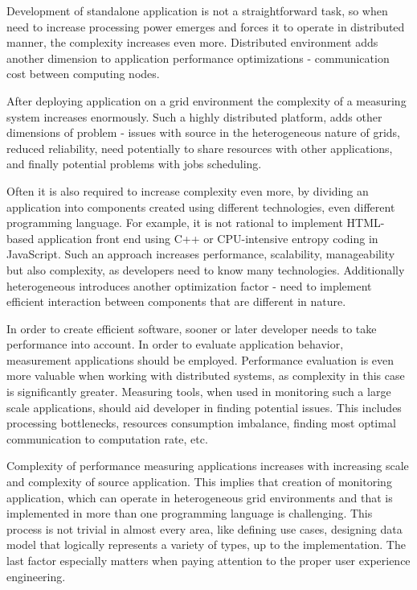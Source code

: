 Development of standalone application is not a straightforward task, so when need to increase processing power emerges and forces it to operate in distributed manner, the complexity increases even more. Distributed environment adds another dimension to application performance optimizations - communication cost between computing nodes.

After deploying application on a grid environment the complexity of a measuring system increases enormously. Such a highly distributed platform, adds other dimensions of problem - issues with source in the heterogeneous nature of grids, reduced reliability, need potentially to share resources with other applications, and finally potential problems with jobs scheduling.

Often it is also required to increase complexity even more, by dividing an application into components created using different technologies, even different programming language. For example, it is not rational to implement HTML-based application front end using C++ or CPU-intensive entropy coding in JavaScript. Such an approach increases performance, scalability, manageability but also complexity, as developers need to know many technologies. Additionally heterogeneous introduces another optimization factor - need to implement efficient interaction between components that are different in nature.

In order to create efficient software, sooner or later developer needs to take performance into account. In order to evaluate application behavior, measurement applications should be employed. Performance evaluation is even more valuable when working with distributed systems, as complexity in this case is significantly greater. Measuring tools, when used in monitoring such a large scale applications, should aid developer in finding potential issues. This includes processing bottlenecks, resources consumption imbalance, finding most optimal communication to computation rate, etc.

Complexity of performance measuring applications increases with increasing scale and complexity of source application. This implies that creation of monitoring application, which can operate in heterogeneous grid environments and that is implemented in more than one programming language is challenging. This process is not trivial in almost every area, like defining use cases, designing data model that logically represents a variety of types, up to the implementation. The last factor especially matters when paying attention to the proper user experience engineering.

